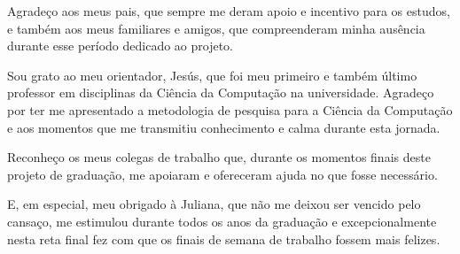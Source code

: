 \begin{agradecimentos}
    Agradeço aos meus pais, que sempre me deram apoio e incentivo para os estudos, e também aos meus familiares e amigos, que compreenderam minha ausência durante esse período dedicado ao projeto.
    
    Sou grato ao meu orientador, Jesús, que foi meu primeiro e também último professor em disciplinas da Ciência da Computação na universidade. Agradeço por ter me apresentado a metodologia de pesquisa para a Ciência da Computação e aos momentos que me transmitiu conhecimento e calma durante esta jornada.
    
    Reconheço os meus colegas de trabalho que, durante os momentos finais deste projeto de graduação, me apoiaram e ofereceram ajuda no que fosse necessário.

    E, em especial, meu obrigado à Juliana, que não me deixou ser vencido pelo cansaço, me estimulou durante todos os anos da graduação e excepcionalmente nesta reta final fez com que os finais de semana de trabalho fossem mais felizes.
\end{agradecimentos}
